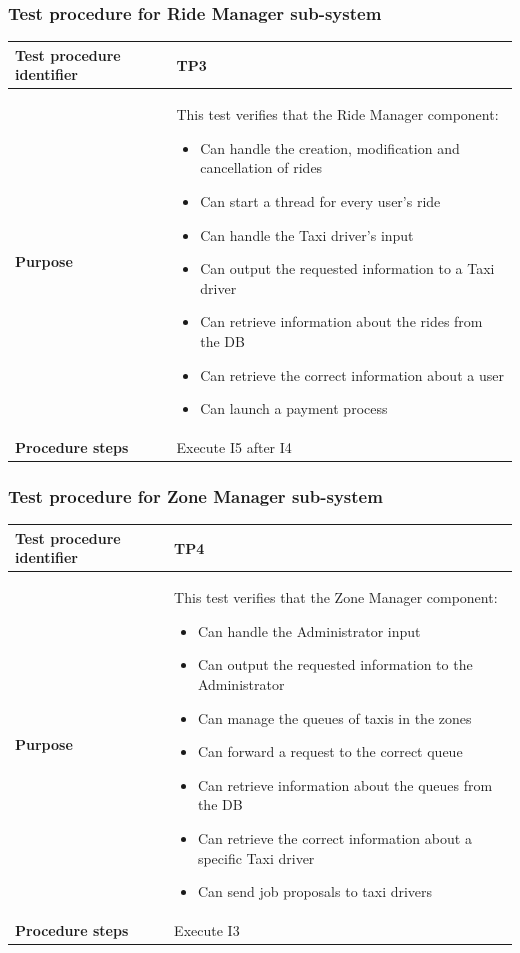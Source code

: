 \documentclass[a4paper,11pt]{report} %
\begin{document}
			\subsubsection{Test procedure for Ride Manager sub-system} \label{sec:3.2.3}
				\begin{center}
					\begin{tabular}{| l | p{9.5cm} |}\hline
						\textbf{Test procedure identifier} & TP3\\\hline
						\textbf{Purpose} & This test verifies that the Ride Manager component: \begin{itemize}
							\item Can handle the creation, modification and cancellation of rides
							\item Can start a thread for every user's ride
							\item Can handle the Taxi driver's input
							\item Can output the requested information to a Taxi driver
							\item Can retrieve information about the rides from the DB
							\item Can retrieve the correct information about a user
							\item Can launch a payment process
						\end{itemize}\\\hline
						\textbf{Procedure steps} & Execute I5 after I4 \\\hline
					\end{tabular}
				\end{center}
			
		\pagebreak				
			\subsubsection{Test procedure for Zone Manager sub-system} \label{sec:3.2.4}
				\begin{center}
					\begin{tabular}{| l | p{9.5cm} |}\hline
						\textbf{Test procedure identifier} & TP4\\\hline
						\textbf{Purpose} & This test verifies that the Zone Manager component: \begin{itemize}
							\item Can handle the Administrator input		
							\item Can output the requested information to the Administrator										
							\item Can manage the queues of taxis in the zones
							\item Can forward a request to the correct queue
							\item Can retrieve information about the queues from the DB
							\item Can retrieve the correct information about a specific Taxi driver
							\item Can send job proposals to taxi drivers
						\end{itemize}\\\hline
						\textbf{Procedure steps} & Execute I3 \\\hline
					\end{tabular}
				\end{center}
		\pagebreak				
\end{document}
